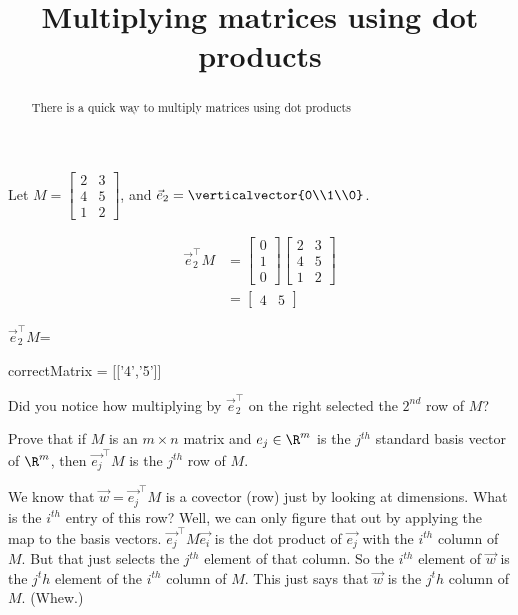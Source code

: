 \documentclass{ximera}
\title{Multiplying matrices using dot products}
\begin{document}
\begin{abstract}
	There is a quick way to multiply matrices using dot products
\end{abstract}

\begin{question}
	Let $M =  \begin{bmatrix}2&3\\4&5\\1&2\end{bmatrix}$, and $\vec{e}_2 = \verticalvector{0\\1\\0}$.
	\begin{solution}
	\begin{hint}
		\begin{align*}
			\vec{e}_2^\top M &= \begin{bmatrix} 0\\1\\0\end{bmatrix} \begin{bmatrix}2&3\\4&5\\1&2\end{bmatrix}\\
			&= \begin{bmatrix} 4&5\end{bmatrix}
		\end{align*}
	\end{hint}
		$\vec{e}_2^\top M$=
		\begin{matrix-answer}[name=w]
			correctMatrix = [['4','5']]
		\end{matrix-answer}
	\end{solution}
	
	Did you notice how multiplying by $\vec{e}_2^\top$ on the right selected the $2^{nd}$ row of $M$?
\end{question}

Prove that if $M$ is an $m \times n$ matrix and $e_j \in \R^m$ is the $j^{th}$ standard basis vector of $\R^m$, then
$\vec{e_j}^\top M $ is the $j^{th}$ row of $M$.
\begin{free-response}
We know that $\vec{w} = \vec{e_j}^\top M$ is a covector (row) just by looking at dimensions.  What is the $i^{th}$ entry of this row?
Well, we can only figure that out by applying the map to the basis vectors.  $\vec{e_j}^\top M\vec{e_i}$ is the dot product of $\vec{e_j}$ with the
$i^{th}$ column of $M$.  But that just selects the $j^{th}$ element of that column.  So the $i^{th}$ element of $\vec{w}$ is the $j^th$ element of the $i^{th}$ column
of $M$.  This just says that $\vec{w}$ is the $j^th$ column of $M$. (Whew.)
\end{free-response}
\end{document}
